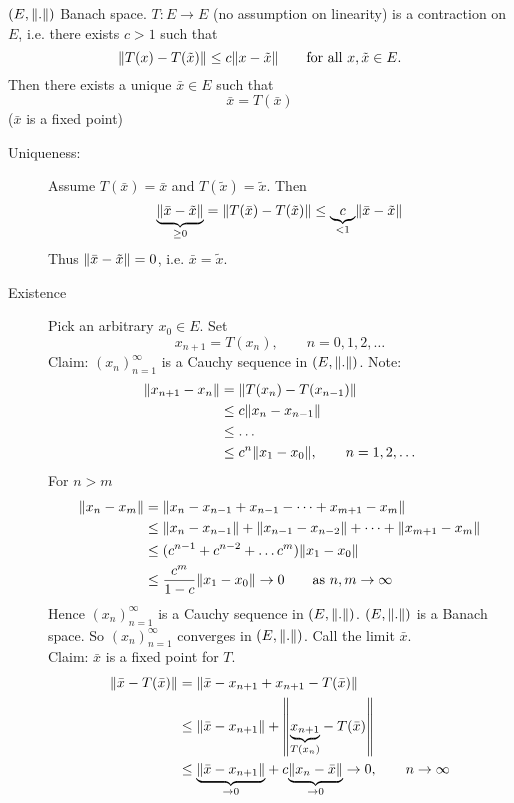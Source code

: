 \begin{theorem*}
	$(E, \norm{.})$ Banach space. $T: E \to E$ (no assumption on linearity) is a contraction on $E$, i.e. there exists $c>1$ such that
	\[
		\norm{T(x)-T(\tilde x)} \leq c \norm{x- \tilde x} \qquad \text{for all }x,\tilde x \in E.
	\]
	Then there exists a unique $ \bar{x} \in E$ such that 
	\[
		\bar{x} = T( \bar{ x})
	\]
	($\bar{x}$ is a fixed point)
\end{theorem*}
\begin{beweis}
	\begin{description}
		\item[Uniqueness:]Assume $T( \bar{x}) = \bar{x}$ and $T ( \tilde x) = \tilde x$. Then
		\[
			\underset{\geq 0}{\underbrace{\norm{ \bar{ x} - \tilde x }}} = \norm{T( \bar{x})- T( \tilde x)} \leq \underset{< 1}{\underbrace{c}} \norm{ \bar{x}- \tilde x}
		\] 
		Thus $\norm{\bar{x}- \tilde x} = 0$, i.e. $\bar{x} = \tilde x$.
		\item[Existence] Pick an arbitrary $x_0 \in E$. Set
		\[
			x_{n+1} = T(x_{n}), \qquad n=0,1,2,\dots
		\]
		Claim: $(x_n)_{n=1}^{\infty}$ is a Cauchy sequence in $(E,\norm{.})$.
		Note:
		\begin{align*}
			\norm{x_{n+1}-x_n}  &= \norm{T(x_n)-T(x_{n-1})} \\
			&\leq  c \norm{x_n - x_{n-1}} \\
			&\leq \dots \\
			&\leq  c^n \norm{x_1-x_0}, \qquad n=1,2,\dots 
		\end{align*}
		For $n>m$
		\begin{align*}
			\norm{x_n-x_m} &= \norm{x_n - x_{n-1}+ x_{n-1}- \dots + x_{m+1}- x_m} \\
			&\leq \norm{x_n - x_{n-1}} + \norm{x_{n-1} - x_{n-2}} + \dots + \norm{x_{m+1}- x_m} \\
			&\leq (c^{n-1}+ c^{n-2} + \dots c^m) \norm{x_1-x_0} \\
			&\leq \frac{c^m}{1-c} \norm{x_1 - x_0} \to 0 \qquad \text{as }n,m \to \infty
		\end{align*}
		Hence $(x_n)_{n=1}^{\infty}$ is a Cauchy sequence in $(E,\norm{.})$. $(E, \norm{.})$ is a Banach space. So $(x_n)_{n=1}^{\infty}$ converges in $(E,\norm{.})$. Call the limit $\bar{x}$. \\
		Claim: $\bar{x}$ is a fixed point for $T$. 
		\begin{align*}
			\norm{\bar{ x}- T(\bar{x})} & = \norm{\bar{x}-x_{n+1}+ x_{n+1} - T(\bar{x})} \\
			&\leq \norm{\bar{x}-x_{n+1}} + \norm{\underset{T(x_n)}{\underbrace{x_{n+1}}} - T(\bar{x})} \\
			&\leq \underset{\to 0}{\underbrace{\norm{\bar{x}- x_{n+1}}}} + c \underset{\to 0}{\underbrace{\norm{x_n - \bar{x}}}} \to 0, \qquad n \to \infty
		\end{align*}
	\end{description}
\end{beweis}
